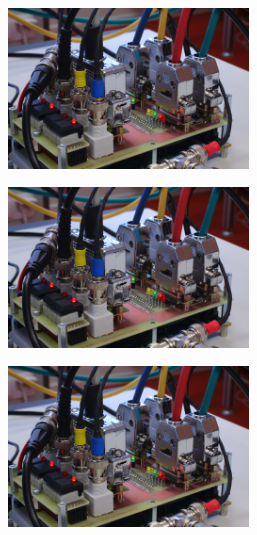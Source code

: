 \documentclass[arbeit=master,oneside,BCOR=12mm]{ArbeitRST}
\begin{document}
\begin{figure}[ht]
\begin{subfigure}[c]{0.5\textwidth}
\centering
\includegraphics[width=0.7\textwidth]{bild}
\end{subfigure}
\begin{subfigure}[c]{0.5\textwidth}
\centering
\includegraphics[width=0.7\textwidth]{bild}
\end{subfigure}
\begin{subfigure}[c]{0.5\textwidth}
\centering
\includegraphics[width=0.7\textwidth]{bild}
\end{subfigure}
\begin{subfigure}[c]{0.5\textwidth}

\end{subfigure}
\end{figure}
\end{document}
